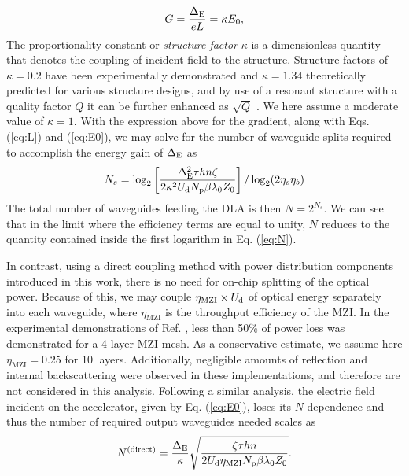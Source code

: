 \begin{equation}
    G = \frac{\Delta_\textrm{E}}{eL} = \kappa E_\textrm{0},
    \label{eq:G}
\end{equation}
%
The proportionality constant or \textit{structure factor} $\kappa$ is a dimensionless quantity that denotes the coupling of incident field to the structure. Structure factors of $\kappa = 0.2$ have been experimentally demonstrated \cite{cesar_optical_2018} and $\kappa = 1.34$ theoretically predicted \cite{bar2019design} for various structure designs, and by use of a resonant structure with a quality factor $Q$ it can be further enhanced as $\sqrt{Q}$ \cite{hughes_-chip_2018}. We here assume a moderate value of $\kappa = 1$. With the expression above for the gradient, along with Eqs. (\ref{eq:L}) and (\ref{eq:E0}), we may solve for the number of waveguide splits required to accomplish the energy gain of $\Delta_\textrm{E}$ as
\begin{equation}
    N_s = \log_2 \left[ \frac{\Delta_\textrm{E}^2 \tau h n \zeta}{2  \kappa^2 U_\textrm{d} N_\textrm{p} \beta \lambda_\textrm{0} Z_0} \right] / \log_2 (2 \eta_s \eta_b)
    \label{eq:N}
\end{equation}
The total number of waveguides feeding the DLA is then $N = 2^{N_s}$. We can see that in the limit where the efficiency terms are equal to unity, $N$ reduces to the quantity contained inside the first logarithm in Eq. (\ref{eq:N}).

In contrast, using a direct coupling method with power distribution components introduced in this work, there is no need for on-chip splitting of the optical power.  Because of this, we may couple $\eta_\textrm{MZI} \times U_\textrm{d}$ of optical energy separately into each waveguide, where $\eta_\textrm{MZI}$ is the throughput efficiency of the MZI. In the experimental demonstrations of Ref. \cite{Annoni2017,shen2017deep}, less than 50\% of power loss was demonstrated for a 4-layer MZI mesh. As a conservative estimate, we assume here $\eta_\textrm{MZI} = 0.25$ for 10 layers.  Additionally, negligible amounts of reflection and internal backscattering were observed in these implementations, and therefore are not considered in this analysis.  Following a similar analysis, the electric field incident on the accelerator, given by Eq. (\ref{eq:E0}), loses its $N$ dependence and thus the number of required output waveguides needed scales as 
\begin{equation}
    N^{(\textrm{direct})} =  \frac{\Delta_\textrm{E}}{\kappa} \sqrt{\frac{\zeta \tau h n}{2 U_\textrm{d} \eta_\textrm{MZI} N_\textrm{p} \beta \lambda_\textrm{0} Z_0 }}.
    \label{eq:N_direct}
\end{equation}

